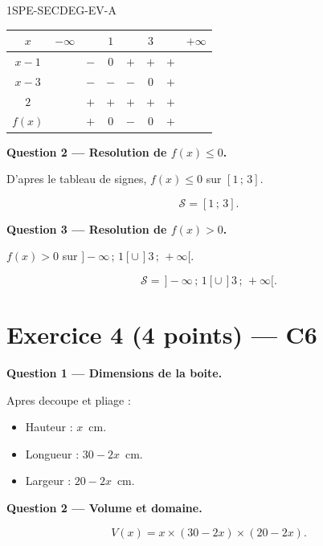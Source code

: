 \begin{corrige}{1SPE-SECDEG-EV-A}
\begin{center}
\begin{tabular}{|c|ccccccc|}
\hline
$x$ & $-\infty$ & & $1$ & & $3$ & & $+\infty$ \\
\hline
$x - 1$ & & $-$ & $0$ & $+$ & $+$ & $+$ & \\
$x - 3$ & & $-$ & $-$ & $-$ & $0$ & $+$ & \\
$2$ & & $+$ & $+$ & $+$ & $+$ & $+$ & \\
\hline
$f(x)$ & & $+$ & $0$ & $-$ & $0$ & $+$ & \\
\hline
\end{tabular}
\end{center}

\medskip
\textbf{Question 2 — Resolution de $f(x) \leq 0$.}

D'apres le tableau de signes, $f(x) \leq 0$ sur $[1\,;\,3]$.

\[
\boxed{\mathcal{S} = [1\,;\,3].}
\]

\medskip
\textbf{Question 3 — Resolution de $f(x) > 0$.}

$f(x) > 0$ sur $]-\infty\,;\,1[ \cup \,]3\,;\,+\infty[$.

\[
\boxed{\mathcal{S} = \,]-\infty\,;\,1[ \cup \,]3\,;\,+\infty[.}
\]

\section*{Exercice 4 \hfill (4 points) — C6}


\bigskip
\textbf{Question 1 — Dimensions de la boite.}


Apres decoupe et pliage :
\begin{itemize}
  \item Hauteur : $x$~cm.
  \item Longueur : $30 - 2x$~cm.
  \item Largeur : $20 - 2x$~cm.
\end{itemize}

\medskip
\textbf{Question 2 — Volume et domaine.}

\[
V(x) = x \times (30-2x) \times (20-2x).
\]


\end{corrige}
